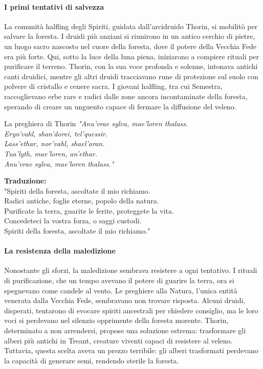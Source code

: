 \documentclass[letterpaper,twocolumn,openany,nodeprecatedcode]{dndbook}
\begin{document}
\paragraph{I primi tentativi di salvezza}  
La comunità halfling degli Spiriti, guidata dall’arcidruido Thorin, si mobilitò per salvare la foresta. I druidi più anziani si riunirono in un antico cerchio di pietre, un luogo sacro nascosto nel cuore della foresta, dove il potere della Vecchia Fede era più forte. Qui, sotto la luce della luna piena, iniziarono a compiere rituali per purificare il terreno. Thorin, con la sua voce profonda e solenne, intonava antichi canti druidici, mentre gli altri druidi tracciavano rune di protezione sul suolo con polvere di cristallo e cenere sacra. I giovani halfling, tra cui Semestra, raccoglievano erbe rare e radici dalle zone ancora incontaminate della foresta, sperando di creare un unguento capace di fermare la diffusione del veleno.

\begin{DndSidebar}[float=!h]{La preghiera di Thorin}
\textit{
"Anu'vrae sylva, mae'loren thalass.\\
Eryn'vahl, shan'dorei, tel'quessir.\\
Lass'ethar, nor'vahl, shael'aran.\\
Tua'lyth, mae'loren, an'ethar.\\
Anu'vrae sylva, mae'loren thalass."\\
}

\textbf{Traduzione:}\\
"Spiriti della foresta, ascoltate il mio richiamo.\\
Radici antiche, foglie eterne, popolo della natura.\\  
Purificate la terra, guarite le ferite, proteggete la vita.\\  
Concedeteci la vostra forza, o saggi custodi.\\  
Spiriti della foresta, ascoltate il mio richiamo."\\
\end{DndSidebar}

\paragraph{La resistenza della maledizione}  
Nonostante gli sforzi, la maledizione sembrava resistere a ogni tentativo. I rituali di purificazione, che un tempo avevano il potere di guarire la terra, ora si spegnevano come candele al vento. Le preghiere alla Natura, l’unica entità venerata dalla Vecchia Fede, sembravano non trovare risposta. Alcuni druidi, disperati, tentarono di evocare spiriti ancestrali per chiedere consiglio, ma le loro voci si perdevano nel silenzio opprimente della foresta morente. Thorin, determinato a non arrendersi, propose una soluzione estrema: trasformare gli alberi più antichi in Treant, creature viventi capaci di resistere al veleno. Tuttavia, questa scelta aveva un prezzo terribile: gli alberi trasformati perdevano la capacità di generare semi, rendendo sterile la foresta.
\end{document}
